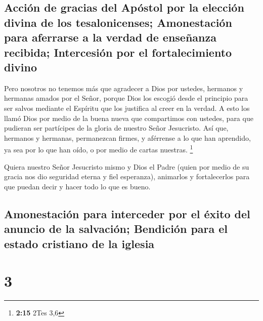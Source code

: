 \hypertarget{acciuxf3n-de-gracias-del-apuxf3stol-por-la-elecciuxf3n-divina-de-los-tesalonicenses-amonestaciuxf3n-para-aferrarse-a-la-verdad-de-enseuxf1anza-recibida-intercesiuxf3n-por-el-fortalecimiento-divino}{%
\subsection{Acción de gracias del Apóstol por la elección divina de los
tesalonicenses; Amonestación para aferrarse a la verdad de enseñanza
recibida; Intercesión por el fortalecimiento
divino}\label{acciuxf3n-de-gracias-del-apuxf3stol-por-la-elecciuxf3n-divina-de-los-tesalonicenses-amonestaciuxf3n-para-aferrarse-a-la-verdad-de-enseuxf1anza-recibida-intercesiuxf3n-por-el-fortalecimiento-divino}}

 Pero nosotros no tenemos más que agradecer a Dios por
ustedes, hermanos y hermanas amados por el Señor, porque Dios los
escogió desde el principio para ser salvos mediante el Espíritu que los
justifica al creer en la verdad.  A esto los llamó Dios
por medio de la buena nueva que compartimos con ustedes, para que
pudieran ser partícipes de la gloria de nuestro Señor Jesucristo.
 Así que, hermanos y hermanas, permanezcan firmes, y
aférrense a lo que han aprendido, ya sea por lo que han oído, o por
medio de cartas nuestras. \footnote{\textbf{2:15} 2Tes 3,6}

 Quiera nuestro Señor Jesucristo mismo y Dios el Padre
(quien por medio de su gracia nos dio seguridad eterna y fiel
esperanza),  animarlos y fortalecerlos para que puedan
decir y hacer todo lo que es bueno.

\hypertarget{amonestaciuxf3n-para-interceder-por-el-uxe9xito-del-anuncio-de-la-salvaciuxf3n-bendiciuxf3n-para-el-estado-cristiano-de-la-iglesia}{%
\subsection{Amonestación para interceder por el éxito del anuncio de la
salvación; Bendición para el estado cristiano de la
iglesia}\label{amonestaciuxf3n-para-interceder-por-el-uxe9xito-del-anuncio-de-la-salvaciuxf3n-bendiciuxf3n-para-el-estado-cristiano-de-la-iglesia}}

\hypertarget{section-2}{%
\section{3}\label{section-2}}

